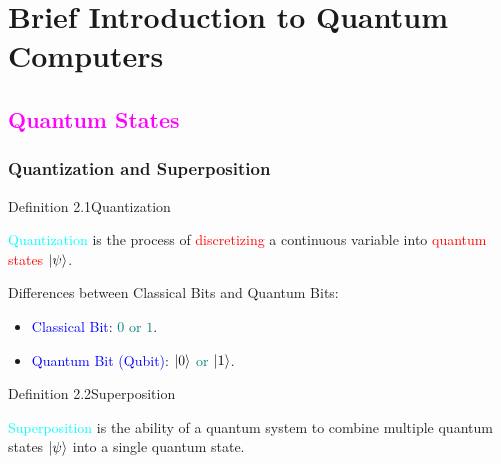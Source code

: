\documentclass{book}
\begin{document}
\chapter{Brief Introduction to Quantum Computers}
\textcolor{magenta}{\section{\textbf{Quantum States}}}
\subsection{Quantization and Superposition}
\begin{defBox}{Definition 2.1}{Quantization}
    \raggedright
    \textcolor{cyan}{Quantization} is the process of \textcolor{red}{discretizing} a continuous variable into \textcolor{red}{quantum states $\ket{\psi}$}.
\end{defBox}
Differences between Classical Bits and Quantum Bits:
\begin{itemize}
    \item \textcolor{blue}{Classical Bit}: \textcolor{teal}{\(0\) or \(1\)}.
    \item \textcolor{blue}{Quantum Bit (Qubit)}: \textcolor{teal}{\(\ket{0}\) or \(\ket{1}\)}.
\end{itemize}
\begin{defBox}{Definition 2.2}{Superposition}
    \raggedright
    \textcolor{cyan}{Superposition} is the ability of a quantum system to combine multiple quantum states \(\ket{\psi}\) into a single quantum state.
\end{defBox}
\end{document}
